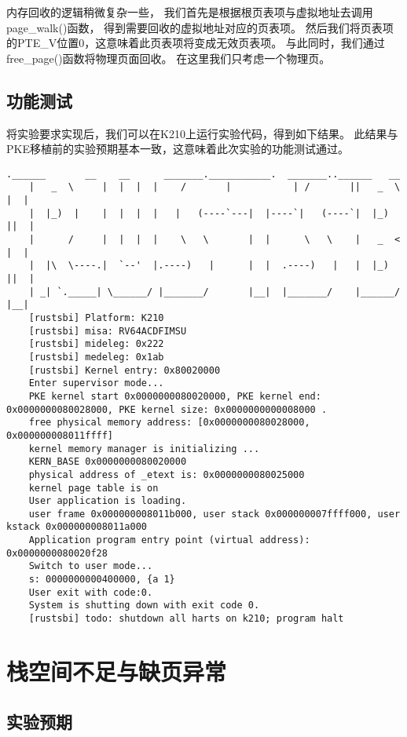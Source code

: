 内存回收的逻辑稍微复杂一些，
我们首先是根据根页表项与虚拟地址去调用page\_walk()函数，
得到需要回收的虚拟地址对应的页表项。
然后我们将页表项的PTE\_V位置0，这意味着此页表项将变成无效页表项。
与此同时，我们通过free\_page()函数将物理页面回收。
在这里我们只考虑一个物理页。

\subsection{功能测试}

将实验要求实现后，我们可以在K210上运行实验代码，得到如下结果。
此结果与PKE移植前的实验预期基本一致，这意味着此次实验的功能测试通过。

\begin{lstlisting}[caption={lab5实验结果（移植K210后）}]
    .______       __    __      _______.___________.  _______..______   __
    |   _  \     |  |  |  |    /       |           | /       ||   _  \ |  |
    |  |_)  |    |  |  |  |   |   (----`---|  |----`|   (----`|  |_)  ||  |
    |      /     |  |  |  |    \   \       |  |      \   \    |   _  < |  |
    |  |\  \----.|  `--'  |.----)   |      |  |  .----)   |   |  |_)  ||  |
    | _| `._____| \______/ |_______/       |__|  |_______/    |______/ |__|
    [rustsbi] Platform: K210
    [rustsbi] misa: RV64ACDFIMSU
    [rustsbi] mideleg: 0x222
    [rustsbi] medeleg: 0x1ab
    [rustsbi] Kernel entry: 0x80020000
    Enter supervisor mode...
    PKE kernel start 0x0000000080020000, PKE kernel end: 0x0000000080028000, PKE kernel size: 0x0000000000008000 .
    free physical memory address: [0x0000000080028000, 0x000000008011ffff]
    kernel memory manager is initializing ...
    KERN_BASE 0x0000000080020000
    physical address of _etext is: 0x0000000080025000
    kernel page table is on
    User application is loading.
    user frame 0x000000008011b000, user stack 0x000000007ffff000, user kstack 0x000000008011a000
    Application program entry point (virtual address): 0x0000000080020f28
    Switch to user mode...
    s: 0000000000400000, {a 1}
    User exit with code:0.
    System is shutting down with exit code 0.
    [rustsbi] todo: shutdown all harts on k210; program halt    
\end{lstlisting}

\section{栈空间不足与缺页异常}

\subsection{实验预期}

